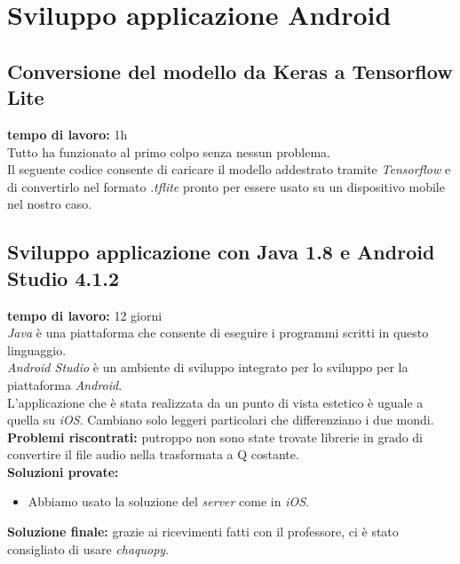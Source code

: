 \section{Sviluppo applicazione Android}
\subsection{Conversione del modello da Keras a Tensorflow Lite}
\textbf{tempo di lavoro:} 1h\\
\newline
Tutto ha funzionato al primo colpo senza nessun problema.\\
Il seguente codice consente di caricare il modello addestrato tramite \textit{Tensorflow} e di convertirlo nel formato .\textit{tflite} pronto per essere usato su un dispositivo mobile nel nostro caso.

\subsection{Sviluppo applicazione con Java 1.8 e Android Studio 4.1.2}
\textbf{tempo di lavoro:} 12 giorni \\
\newline
\textit{Java} è una piattaforma che consente di eseguire i programmi scritti in questo linguaggio.\\
\newline
\textit{Android Studio} è un ambiente di sviluppo integrato per lo sviluppo per la piattaforma \textit{Android}.\\
\newline
L'applicazione che è stata realizzata da un punto di vista estetico è uguale a quella su \textit{iOS}. Cambiano solo leggeri particolari che differenziano i due mondi.\\
\newline
\textbf{Problemi riscontrati:} putroppo non sono state trovate librerie in grado di convertire il file audio nella trasformata a Q costante.\\
\newline
%
\textbf{Soluzioni provate:}
\begin{itemize}
	\item Abbiamo usato la soluzione del \textit{server} come in \textit{iOS}.\\
\end{itemize}
%
\textbf{Soluzione finale:} grazie ai ricevimenti fatti con il professore, ci è stato consigliato di usare \textit{chaquopy}.